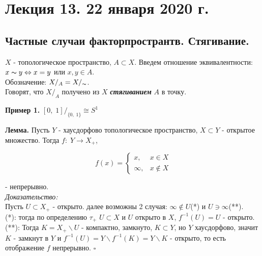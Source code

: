 \documentclass[../../main.tex]{subfiles}
\begin{document}
\section{Лекция 13. 22 января 2020 г.}

\subsection{Частные случаи факторпространтв. Стягивание.}

$X$ - топологическое пространство, $A\subset X$. Введем отношение эквивалентности: $x\thicksim y\Leftrightarrow x = y$ или $x, y\in A$.\\
Обозначение: $X/_A = X/_\thicksim$.\\
 Говорят, что $X/_A$ получено из $X$ \textbf{\textit{стягиванием}} $A$ в точку.

\textbf{Пример 1.} $[0,\;1]/_{\{0,\;1\}}\cong S^1$

\textbf{Лемма.} Пусть $Y$ - хаусдорфово топологическое пространство, $X\subset Y$ - открытое множество. Тогда $f:\;Y\rightarrow X_+$,\\
\begin{minipage}[]{0.2\linewidth}

\begin{equation*}
    f(x) = \begin{cases}
    x, & x\in X\\
    \infty, & x\notin X
    \end{cases}
\end{equation*} 
\end{minipage} - непрерывно.\\
\textit{Доказательство:}\\
Пусть $U\subset X_+$ - открыто. далее возможны 2 случая: $\infty\notin U$(*) и $U\ni\infty$(**).\\
(*): тогда по определению $\tau_+$ $U\subset X$ и $U$ открыто в $X$, $f^{-1}(U) = U$ - открыто.\\
(**): Тогда $K = X_+\backslash U$ - компактно, замкнуто, $K\subset Y$, но $Y$ хаусдорфово, значит $K$ - замкнут в $Y$ и $f^{-1}(U) = Y\backslash f^{-1}(K) = Y\backslash K$ - открыто, то есть отображение $f$ непрерывно. $\square$
\end{document}
